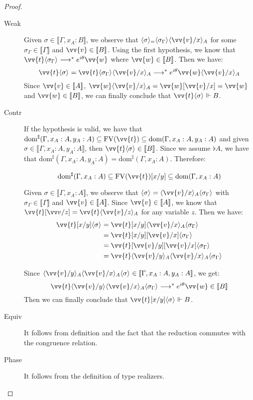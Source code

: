 \documentclass[runningheads,orivec,envcountsame,envcountsect]{llncs}
\newcommand\lra{\longrightarrow}
\newcommand\ansubst[2]{\ensuremath{\langle #1 \rangle_{#2}}}
\newcommand\dom[1]{\mathrm{dom}(#1)}
\newcommand\sdom[1]{\mathrm{dom}^{\sharp}(#1)}
\newcommand\FV[1]{\mathrm{FV}(#1)}
\def\eval{\lra^*}
\def\sem#1{\llbracket#1\rrbracket}
\def\real{\Vdash}
\begin{document}
\begin{proof}
\begin{description}
    \item[Weak] Given $\sigma\in\sem{\Gamma,x_A:B}$, we observe that $\ansubst{\sigma}=\ansubst{\sigma_\Gamma}{}\ansubst{\vv{v}/x}{A}$ for some $\sigma_\Gamma\in\sem{\Gamma}$ and $\vv{v}\in\sem{B}$. Using the first hypothesis, we know that $\vv{t}\ansubst{\sigma_\Gamma}{}\eval e^{i\theta}\vv{w}$ where $\vv{w}\in\sem{B}$. Then we have:
    \[
    \vv{t}\ansubst{\sigma}{}=\vv{t}\ansubst{\sigma_\Gamma}{}\ansubst{\vv{v}/x}{A}\eval e^{i\theta}\vv{w}\ansubst{\vv{v}/x}{A}
    \]
    Since $\vv{v}\in\sem{A}$, $\vv{w}\ansubst{\vv{v}/x}{A}=\vv{w}[\vv{v}/x]=\vv{w}$ and $\vv{w}\in\sem{B}$, we can finally conclude that $\vv{t}\ansubst{\sigma}{}\real B$.

    \item[Contr] If the hypothesis is valid, we have that $\sdom{\Gamma, x_A:A, y_A:A}\subseteq\FV{\vv{t}}\subseteq\dom{\Gamma,x_A:A, y_A:A}$ and given $\sigma\in\sem{\Gamma,x_A:A, y_A:A}$, then $\vv{t}\ansubst{\sigma}{}\in\sem{B}$. Since we assume $\flat A$, we have that $\sdom{\Gamma,x_A:A, y_A:A}=\sdom{\Gamma,x_A:A}$. Therefore:
    
    \[
    \sdom{\Gamma,x_A:A}\subseteq\FV{\vv{t}}[x/y]\subseteq\dom{\Gamma,x_A:A}
    \]

    Given $\sigma\in\sem{\Gamma,x_A:A}$, we observe that $\ansubst{\sigma}{}=\ansubst{\vv{v}/x}{A}\ansubst{\sigma_\Gamma}{}$ with $\sigma_\Gamma\in\sem{\Gamma}$ and $\vv{v}\in\sem{A}$. Since $\vv{v}\in\sem{A}$, we know that $\vv{t}[\vv v/z] =\vv{t}\ansubst{\vv{v}/z}{A}$ for any variable $z$. Then we have:
    \begin{align*}
        \vv{t}[x/y]\ansubst{\sigma}{} &= \vv{t}[x/y]\ansubst{\vv{v}/x}{A}\ansubst{\sigma_\Gamma}{}\\
        &=\vv{t}[x/y][\vv{v}/x]\ansubst{\sigma_\Gamma}{}\\
        &=\vv{t}[\vv{v}/y][\vv{v}/x]\ansubst{\sigma_\Gamma}{}\\
        &=\vv{t}\ansubst{\vv{v}/y}{A}\ansubst{\vv{v}/x}{A}\ansubst{\sigma_\Gamma}{}    
    \end{align*}
    
    Since $\ansubst{\vv{v}/y}{A}\ansubst{\vv{v}/x}{A}\ansubst{\sigma}{}\in\sem{\Gamma,x_A:A,y_A:A}$, we get:
    \[\vv{t}\ansubst{\vv{v}/y}{}\ansubst{\vv{v}/x}{A}\ansubst{\sigma_\Gamma}{}\eval e^{i\theta}\vv{w}\in\sem{B}\]
    Then we can finally conclude that $\vv{t}[x/y]\ansubst{\sigma}{}\real B$.

    \item[Equiv] It follows from definition and the fact that the reduction commutes with the congruence relation.
    
    \item[Phase] It follows from the definition of type realizers.
    \end{description}
\end{proof}
\end{document}
